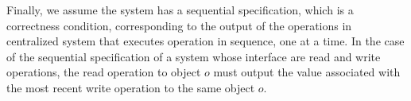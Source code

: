 \documentclass{sig-alternate-05-2015}
\begin{document}

Finally, we assume the system has a sequential specification, which is a correctness condition, corresponding to the output of the operations in centralized system that executes operation in sequence, one at a time. In the case of the sequential specification of a system whose interface are read and write operations, the read operation to object $o$ must output the value associated with the most recent write operation to the same object $o$.

\end{document}
